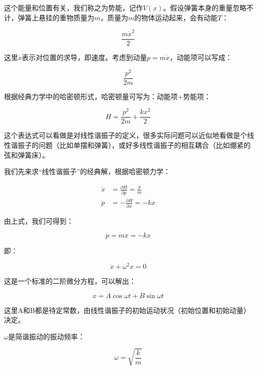 这个能量和位置有关，我们称之为势能，记作$V(x)$。假设弹簧本身的重量忽略不计，弹簧上悬挂的重物质量为$m$，质量为$m$的物体运动起来，会有动能$T$：

\begin{equation}
\frac{m {\dot x}^2}{2}~
\end{equation}

这里$\dot x$表示对位置的求导，即速度。考虑到动量$p = m \dot x$，动能项可以写成：

\begin{equation}
\frac{p^2}{2m}~
\end{equation}

根据经典力学中的哈密顿形式，哈密顿量可写为：动能项+势能项：

\begin{equation}
H = \frac{p^2}{2m} + \frac{kx^2}{2}~
\end{equation}

这个表达式可以看做是对线性谐振子的定义，很多实际问题可以近似地看做是个线性谐振子的问题（比如单摆和弹簧），或好多线性谐振子的相互耦合（比如绷紧的弦和弹簧床）。

我们先来求“线性谐振子”的经典解，根据哈密顿力学：

\begin{align}
\dot x &= \frac{\partial H}{\partial p} = \frac{p}{m}\\
\dot p &= - \frac{\partial H}{\partial x} = - kx~
\end{align}

由上式，我们可得到：

\begin{equation}
\dot p = m \ddot x = - k x~
\end{equation}

即：

\begin{equation}
\ddot x + \omega^2 x = 0~
\end{equation}

这是一个标准的二阶微分方程，可以解出：

\begin{equation}
x = A \cos \omega t + B \sin \omega t~
\end{equation}

这里A和B都是待定常数，由线性谐振子的初始运动状况（初始位置和初始动量）决定。

$\omega$是简谐振动的振动频率：

\begin{equation}
\omega = \sqrt{\frac{k}{m}}~
\end{equation}

